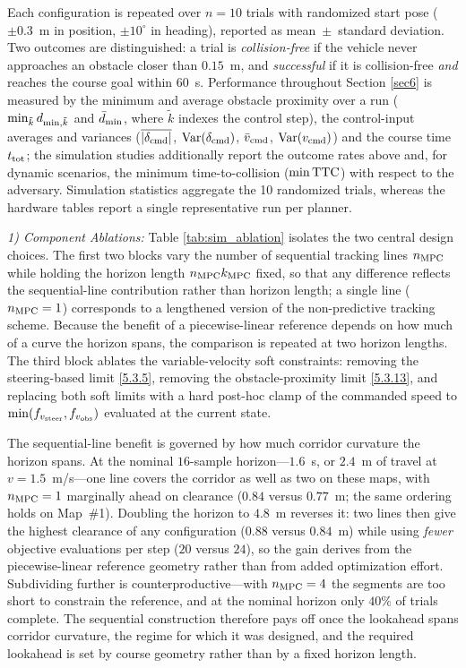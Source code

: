 \documentclass[journal]{IEEEtran}
\begin{document}
Each configuration is repeated over $n=10$ trials with randomized start pose ($\pm0.3$~m in position, $\pm10^{\circ}$ in heading), reported as mean~$\pm$~standard deviation. Two outcomes are distinguished: a trial is \emph{collision-free} if the vehicle never approaches an obstacle closer than $0.15$~m, and \emph{successful} if it is collision-free \emph{and} reaches the course goal within $60$~s. Performance throughout Section \ref{sec6} is measured by the minimum and average obstacle proximity over a run ($\min_{\tilde k} d_{\textup{min},\tilde k}$ and $\bar d_\textup{min}$, where $\tilde k$ indexes the control step), the control-input averages and variances ($\overline{|\delta_{\textup{cmd}}|}$, $\mathrm{Var}(\delta_{\textup{cmd}})$, $\bar v_{\textup{cmd}}$, $\mathrm{Var}(v_{\textup{cmd}})$) and the course time $t_\textup{tot}$; the simulation studies additionally report the outcome rates above and, for dynamic scenarios, the minimum time-to-collision ($\min\textup{TTC}$) with respect to the adversary. Simulation statistics aggregate the 10 randomized trials, whereas the hardware tables report a single representative run per planner.

\textit{1) Component Ablations:} Table \ref{tab:sim_ablation} isolates the two central design choices. The first two blocks vary the number of sequential tracking lines $n_\textup{MPC}$ while holding the horizon length $n_\textup{MPC}k_\textup{MPC}$ fixed, so that any difference reflects the sequential-line contribution rather than horizon length; a single line ($n_\textup{MPC}=1$) corresponds to a lengthened version of the non-predictive tracking scheme. Because the benefit of a piecewise-linear reference depends on how much of a curve the horizon spans, the comparison is repeated at two horizon lengths. The third block ablates the variable-velocity soft constraints: removing the steering-based limit \eqref{5.3.5}, removing the obstacle-proximity limit \eqref{5.3.13}, and replacing both soft limits with a hard post-hoc clamp of the commanded speed to $\min(f_{v_\textup{steer}},f_{v_\textup{obs}})$ evaluated at the current state.

The sequential-line benefit is governed by how much corridor curvature the horizon spans. At the nominal $16$-sample horizon---$1.6$~s, or $2.4$~m of travel at $v=1.5$~m/s---one line covers the corridor as well as two on these maps, with $n_\textup{MPC}=1$ marginally ahead on clearance ($0.84$ versus $0.77$~m; the same ordering holds on Map~\#1). Doubling the horizon to $4.8$~m reverses it: two lines then give the highest clearance of any configuration ($0.88$ versus $0.84$~m) while using \emph{fewer} objective evaluations per step ($20$ versus $24$), so the gain derives from the piecewise-linear reference geometry rather than from added optimization effort. Subdividing further is counterproductive---with $n_\textup{MPC}=4$ the segments are too short to constrain the reference, and at the nominal horizon only $40\%$ of trials complete. The sequential construction therefore pays off once the lookahead spans corridor curvature, the regime for which it was designed, and the required lookahead is set by course geometry rather than by a fixed horizon length.
\end{document}
